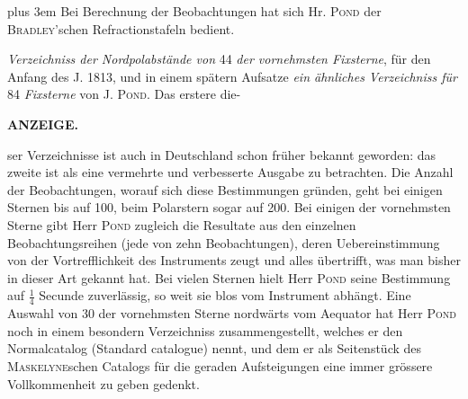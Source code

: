 {\rightskip=0pt plus 3em Bei Berechnung der Beobachtungen hat sich Hr. \textsc{Pond} der \textsc{Bradley}'schen Refractionstafeln bedient.\par}

\emph{Verzeichniss der Nordpolabstände von} 44 \emph{der vornehmsten Fixsterne}, für den Anfang des J. 1813, und in einem spätern Aufsatze \emph{ein ähnliches Verzeichniss für} 84 \emph{Fixsterne} von J. \textsc{Pond}. Das erstere die-\par
{}
\clearpage
\thispagestyle{empty}
\noindent{}%
%
\parbox[t]{\dimexpr\linewidth-24mm\relax}{\centering\footnotesize\bfseries ANZEIGE.\par}%
\makebox[12mm][r]{}\par\nobreak\medskip
\noindent ser Verzeichnisse ist auch in Deutschland schon früher bekannt geworden: das zweite ist als eine vermehrte und verbesserte Ausgabe zu betrachten. Die Anzahl der Beobachtungen, worauf sich diese Bestimmungen gründen, geht bei einigen Sternen bis auf 100, beim Polarstern sogar auf 200. Bei einigen der vornehmsten Sterne gibt Herr \textsc{Pond} zugleich die Resultate aus den einzelnen Beobachtungsreihen (jede von zehn Beobachtungen), deren Uebereinstimmung von der Vortrefflichkeit des Instruments zeugt und alles übertrifft, was man bisher in dieser Art gekannt hat. Bei vielen Sternen hielt Herr \textsc{Pond} seine Bestimmung auf $\frac{1}{4}$ Secunde zuverlässig, so weit sie blos vom Instrument abhängt. Eine Auswahl von 30 der vornehmsten Sterne nordwärts vom Aequator hat Herr \textsc{Pond} noch in einem besondern Verzeichniss zusammengestellt, welches er den Normalcatalog (Standard catalogue) nennt, und dem er als Seitenstück des \textsc{Maskelyne}schen Catalogs für die geraden Aufsteigungen eine immer grössere Vollkommenheit zu geben gedenkt.

